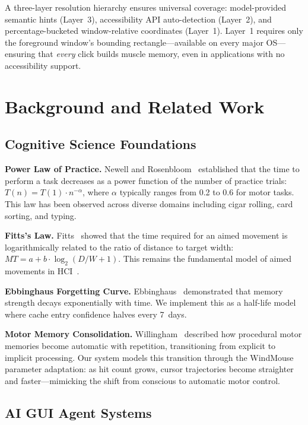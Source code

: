 \documentclass[conference]{IEEEtran}
\begin{document}
A three-layer resolution hierarchy ensures universal coverage: model-provided semantic hints (Layer~3), accessibility API auto-detection (Layer~2), and percentage-bucketed window-relative coordinates (Layer~1). Layer~1 requires only the foreground window's bounding rectangle---available on every major OS---ensuring that \emph{every} click builds muscle memory, even in applications with no accessibility support.

\section{Background and Related Work}

\subsection{Cognitive Science Foundations}

\textbf{Power Law of Practice.} Newell and Rosenbloom~\cite{newell1981} established that the time to perform a task decreases as a power function of the number of practice trials: $T(n) = T(1) \cdot n^{-\alpha}$, where $\alpha$ typically ranges from 0.2 to 0.6 for motor tasks. This law has been observed across diverse domains including cigar rolling, card sorting, and typing.

\textbf{Fitts's Law.} Fitts~\cite{fitts1954} showed that the time required for an aimed movement is logarithmically related to the ratio of distance to target width: $MT = a + b \cdot \log_2(D/W + 1)$. This remains the fundamental model of aimed movements in HCI~\cite{mackenzie1992,soukoreff2004}.

\textbf{Ebbinghaus Forgetting Curve.} Ebbinghaus~\cite{ebbinghaus1885} demonstrated that memory strength decays exponentially with time. We implement this as a half-life model where cache entry confidence halves every 7~days.

\textbf{Motor Memory Consolidation.} Willingham~\cite{willingham1998} described how procedural motor memories become automatic with repetition, transitioning from explicit to implicit processing. Our system models this transition through the WindMouse parameter adaptation: as hit count grows, cursor trajectories become straighter and faster---mimicking the shift from conscious to automatic motor control.

\subsection{AI GUI Agent Systems}
\end{document}

